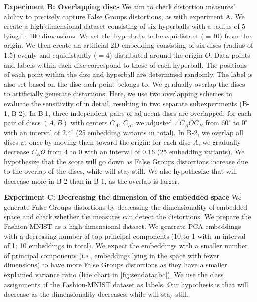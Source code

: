 \noindent
\textbf{Experiment B: Overlapping discs}
We aim to check distortion measures' ability to precisely capture False Groups distortions, as with experiment A.
We create a high-dimensional dataset consisting of six hyperballs with a radius of 5 lying in 100 dimensions. 
We set the hyperballs to be equidistant ($=10$) from the origin. We then create an artificial 2D embedding consisting of six discs (radius of 1.5) evenly and equidistantly ($=4$) distributed around the origin $O$.
Data points and labels within each disc correspond to those of each hyperball.
The positions of each point within the disc and hyperball are determined randomly.
The label is also set based on the disc each point belongs to.
We gradually overlap the discs to artificially generate distortions. Here, we use two overlapping schemes to evaluate the sensitivity of \ltc in detail, resulting in two separate subexperiments (B-1, B-2). In B-1, three independent pairs of adjacent discs are overlapped; for each pair of discs $(A, B)$ with centers $C_A$, $C_B$, we adjusted $\angle C_A O C_B$ from $60^{\circ}$ to $0^{\circ}$ with an interval of $2.4^{\circ}$ (25 embedding variants in total). In B-2, we overlap all discs at once by moving them toward the origin; for each disc $A$, we gradually decrease $C_A O$ from 4 to 0 with an interval of 0.16 (25 embedding variants). 
We hypothesize that the \lt score will go down as False Groups distortions increase due to the overlap of the discs, while \lc will stay still. 
We also hypothesize that \lt will decrease more in B-2 than in B-1, as the overlap is larger.


\noindent
\textbf{Experiment C: Decreasing the dimension of the embedded space}
We generate False Groups distortions by decreasing the dimensionality of embedded space and check whether the measures can detect the distortions. 
We prepare the Fashion-MNIST \cite{xiao2017arxiv} as a high-dimensional dataset. We generate PCA embeddings with a decreasing number of top principal components (10 to 1 with an interval of 1; 10 embeddings in total). 
We expect the embeddings with a smaller number of principal components (i.e., embeddings lying in the space with fewer dimensions) to have more False Groups distortions as they have a smaller explained variance ratio (line chart in \autoref{fig:sendataabc}). 
We use the class assignments of the Fashion-MNIST dataset as labels.
Our hypothesis is that \lt will decrease as the dimensionality decreases, while \lc will stay still.



